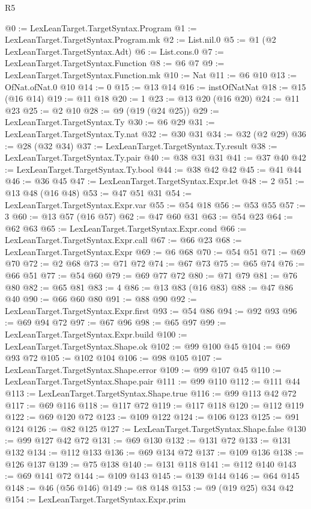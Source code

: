 \begin{lexlean}{R5}
\begin{coremodule}
{{{{{{{{{{{{{@0 := LexLeanTarget.TargetSyntax.Program
@1 := LexLeanTarget.TargetSyntax.Program.mk
@2 := List.nil.{0}
@5 := @1 (@2 LexLeanTarget.TargetSyntax.Adt)
@6 := List.cons.{0}
@7 := LexLeanTarget.TargetSyntax.Function
@8 := @6 @7
@9 := LexLeanTarget.TargetSyntax.Function.mk
@10 := Nat
@11 := @6 @10
@13 := OfNat.ofNat.{0} @10
@14 := 0
@15 := @13 @14
@16 := instOfNatNat
@18 := @15 (@16 @14)
@19 := @11 @18
@20 := 1
@23 := @13 @20 (@16 @20)
@24 := @11 @23
@25 := @2 @10
@28 := @9 (@19 (@24 @25))
@29 := LexLeanTarget.TargetSyntax.Ty
@30 := @6 @29
@31 := LexLeanTarget.TargetSyntax.Ty.nat
@32 := @30 @31
@34 := @32 (@2 @29)
@36 := @28 (@32 @34)
@37 := LexLeanTarget.TargetSyntax.Ty.result
@38 := LexLeanTarget.TargetSyntax.Ty.pair
@40 := @38 @31 @31
@41 := @37 @40
@42 := LexLeanTarget.TargetSyntax.Ty.bool
@44 := @38 @42 @42
@45 := @41 @44
@46 := @36 @45
@47 := LexLeanTarget.TargetSyntax.Expr.let
@48 := 2
@51 := @13 @48 (@16 @48)
@53 := @47 @51 @31
@54 := LexLeanTarget.TargetSyntax.Expr.var
@55 := @54 @18
@56 := @53 @55
@57 := 3
@60 := @13 @57 (@16 @57)
@62 := @47 @60 @31
@63 := @54 @23
@64 := @62 @63
@65 := LexLeanTarget.TargetSyntax.Expr.cond
@66 := LexLeanTarget.TargetSyntax.Expr.call
@67 := @66 @23
@68 := LexLeanTarget.TargetSyntax.Expr
@69 := @6 @68
@70 := @54 @51
@71 := @69 @70
@72 := @2 @68
@73 := @71 @72
@74 := @67 @73
@75 := @65 @74
@76 := @66 @51
@77 := @54 @60
@79 := @69 @77 @72
@80 := @71 @79
@81 := @76 @80
@82 := @65 @81
@83 := 4
@86 := @13 @83 (@16 @83)
@88 := @47 @86 @40
@90 := @66 @60 @80
@91 := @88 @90
@92 := LexLeanTarget.TargetSyntax.Expr.first
@93 := @54 @86
@94 := @92 @93
@96 := @69 @94 @72
@97 := @67 @96
@98 := @65 @97
@99 := LexLeanTarget.TargetSyntax.Expr.build
@100 := LexLeanTarget.TargetSyntax.Shape.ok
@102 := @99 @100 @45
@104 := @69 @93 @72
@105 := @102 @104
@106 := @98 @105
@107 := LexLeanTarget.TargetSyntax.Shape.error
@109 := @99 @107 @45
@110 := LexLeanTarget.TargetSyntax.Shape.pair
@111 := @99 @110
@112 := @111 @44
@113 := LexLeanTarget.TargetSyntax.Shape.true
@116 := @99 @113 @42 @72
@117 := @69 @116
@118 := @117 @72
@119 := @117 @118
@120 := @112 @119
@122 := @69 @120 @72
@123 := @109 @122
@124 := @106 @123
@125 := @91 @124
@126 := @82 @125
@127 := LexLeanTarget.TargetSyntax.Shape.false
@130 := @99 @127 @42 @72
@131 := @69 @130
@132 := @131 @72
@133 := @131 @132
@134 := @112 @133
@136 := @69 @134 @72
@137 := @109 @136
@138 := @126 @137
@139 := @75 @138
@140 := @131 @118
@141 := @112 @140
@143 := @69 @141 @72
@144 := @109 @143
@145 := @139 @144
@146 := @64 @145
@148 := @46 (@56 @146)
@149 := @8 @148
@153 := @9 (@19 @25) @34 @42
@154 := LexLeanTarget.TargetSyntax.Expr.prim
}}}}}}}}}}}}}
\end{coremodule}
\end{lexlean}
